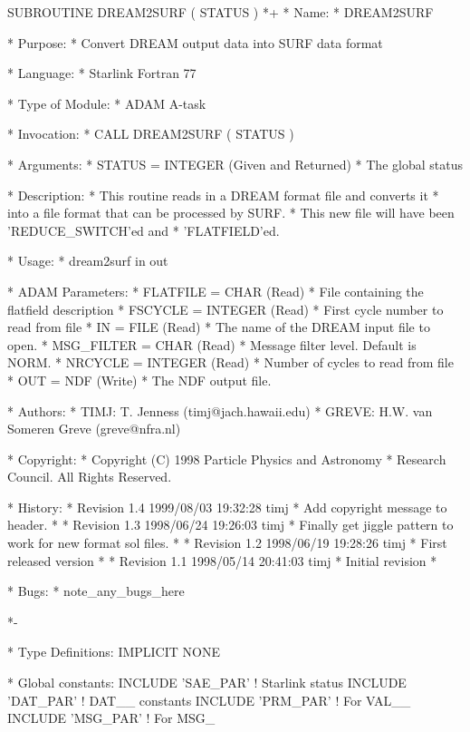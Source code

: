 \documentclass[twoside,11pt,nolof]{starlink}
\begin{document}
\begin{small}
\begin{terminalv}
      SUBROUTINE DREAM2SURF ( STATUS )
*+
*  Name:
*     DREAM2SURF

*  Purpose:
*     Convert DREAM output data into SURF data format

*  Language:
*     Starlink Fortran 77

*  Type of Module:
*     ADAM A-task

*  Invocation:
*     CALL DREAM2SURF ( STATUS )

*  Arguments:
*     STATUS = INTEGER (Given and Returned)
*        The global status

*  Description:
*     This routine reads in a DREAM format file and converts it
*     into a file format that can be processed by SURF.
*     This new file will have been 'REDUCE_SWITCH'ed and
*     'FLATFIELD'ed.

*  Usage:
*     dream2surf in out

*  ADAM Parameters:
*     FLATFILE = CHAR (Read)
*        File containing the flatfield description
*     FSCYCLE = INTEGER (Read)
*        First cycle number to read from file
*     IN = FILE (Read)
*        The name of the DREAM input file to open.
*     MSG_FILTER = CHAR (Read)
*         Message filter level. Default is NORM.
*     NRCYCLE = INTEGER (Read)
*         Number of cycles to read from file
*     OUT = NDF (Write)
*        The NDF output file.

*  Authors:
*     TIMJ: T. Jenness (timj@jach.hawaii.edu)
*     GREVE: H.W. van Someren Greve (greve@nfra.nl)

*  Copyright:
*     Copyright (C) 1998 Particle Physics and Astronomy
*     Research Council. All Rights Reserved.


*  History:
*     Revision 1.4  1999/08/03 19:32:28  timj
*     Add copyright message to header.
*
*     Revision 1.3  1998/06/24 19:26:03  timj
*     Finally get jiggle pattern to work for new format sol files.
*
*     Revision 1.2  1998/06/19 19:28:26  timj
*     First released version
*
*     Revision 1.1  1998/05/14 20:41:03  timj
*     Initial revision
*

*  Bugs:
*     {note_any_bugs_here}

*-

*  Type Definitions:
      IMPLICIT NONE

*  Global constants:
      INCLUDE 'SAE_PAR'       ! Starlink status
      INCLUDE 'DAT_PAR'       ! DAT__ constants
      INCLUDE 'PRM_PAR'       ! For VAL__
      INCLUDE 'MSG_PAR'       ! For MSG_


\end{terminalv}
\end{small}
\end{document}
